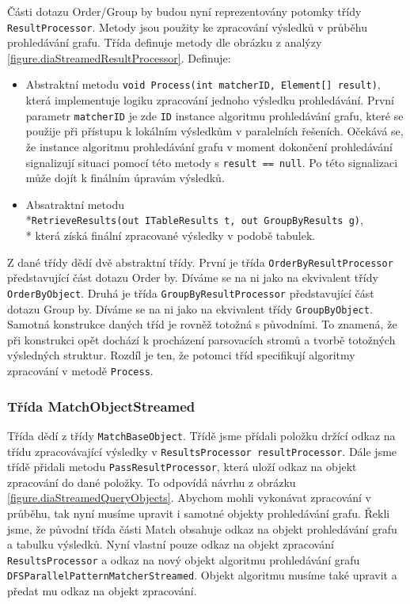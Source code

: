 Části dotazu Order/Group by budou nyní reprezentovány potomky třídy \texttt{ResultProcessor}.
Metody jsou použity ke zpracování výsledků v průběhu prohledávání grafu.
Třída definuje metody dle obrázku z analýzy \ref{figure.diaStreamedResultProcessor}.
Definuje:
\begin{itemize}
\item Abstraktní metodu \texttt{void Process(int matcherID, Element[] result)}, která implementuje logiku zpracování jednoho výsledku prohledávání.
První parametr \texttt{matcherID} je zde \texttt{ID} instance algoritmu prohledávání grafu, které se použije při přístupu k lokálním výsledkům v paralelních řešeních.
Očekává se, že instance algoritmu prohledávání grafu v moment dokončení prohledávání signalizují situaci pomocí této metody s \texttt{result == null}.
Po této signalizaci může dojít k finálním úpravám výsledků.
\item Absatraktní metodu \\*\texttt{RetrieveResults(out ITableResults t, out GroupByResults g)},\\* která získá finální zpracované výsledky v podobě tabulek. 
\end{itemize}
Z dané třídy dědí dvě abstraktní třídy.
První je třída \texttt{OrderByResultProcessor} představující část dotazu Order by.
Díváme se na ni jako na ekvivalent třídy \texttt{OrderByObject}. 
Druhá je třída \texttt{GroupByResultProcessor} představující část dotazu Group by.
Díváme se na ni jako na ekvivalent třídy \texttt{GroupByObject}.
Samotná konstrukce daných tříd je rovněž totožná s původními.
To znamená, že při konstrukci opět dochází k procházení parsovacích stromů a tvorbě totožných výsledných struktur.
Rozdíl je ten, že potomci tříd specifikují algoritmy zpracování v metodě \texttt{Process}.   

\subsubsection{Třída MatchObjectStreamed}

Třída dědí z třídy \texttt{MatchBaseObject}.
Třídě jsme přídali položku držící odkaz na třídu zpracovávající výsledky v \texttt{ResultsProcessor resultProcessor}.
Dále jsme třídě přidali metodu \texttt{PassResultProcessor}, která uloží odkaz na objekt zpracování do dané položky.
To odpovídá návrhu z obrázku \ref{figure.diaStreamedQueryObjects}.
Abychom mohli vykonávat zpracování v průběhu, tak nyní musíme upravit i samotné objekty prohledávání grafu.
Řekli jsme, že původní třída části Match obsahuje odkaz na objekt prohledávání grafu a tabulku výsledků.
Nyní vlastní pouze odkaz na objekt zpracování \texttt{ResultsProcessor} a odkaz na nový objekt algoritmu prohledávání grafu \texttt{DFSParallelPatternMatcherStreamed}.
Objekt algoritmu musíme také upravit a předat mu odkaz na objekt zpracování.

